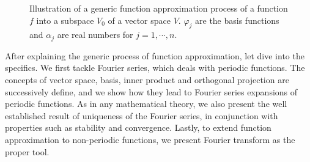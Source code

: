 \documentclass[11pt, oneside]{article}   	%
\begin{document}
\begin{figure}[H]
\begin{center}
\end{center}
\caption{Illustration of a generic function approximation process of a function $f$ into a subspace $V_{0}$ of a vector space $V$. $\varphi_{j}$ are the basis functions and $\alpha_{j}$ are real numbers for $j=1,\cdots,n$.}
\label{figure:il}
\end{figure}
\justify
After explaining the generic process of function approximation, let dive into the specifics. We first tackle Fourier series, which deals with periodic functions. The concepts of vector space, basis, inner product and orthogonal projection are successively define, and we show how they lead to Fourier series expansions of periodic functions. As in any mathematical theory, we also present the well established result of uniqueness of the Fourier series, in conjunction with properties such as stability and convergence. Lastly, to extend function approximation to non-periodic functions, we present Fourier transform as the proper tool. 
\end{document}
